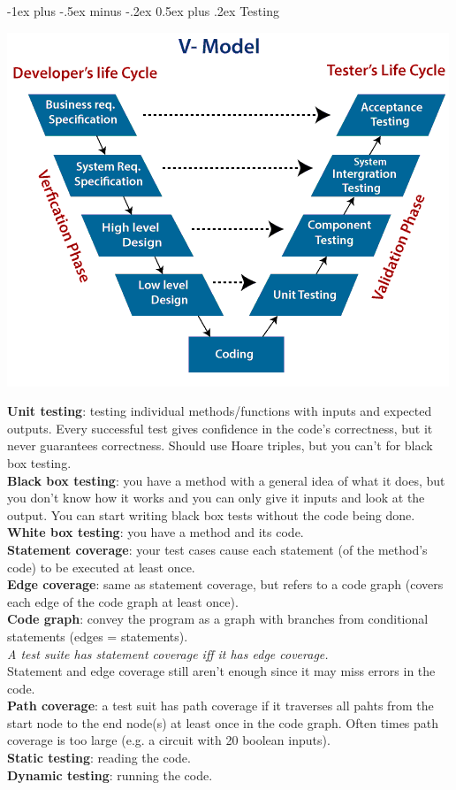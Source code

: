 \documentclass[10pt,landscape]{article}
\makeatletter
\renewcommand{\section}{\@startsection{section}{1}{0mm}%
                                {-1ex plus -.5ex minus -.2ex}%
                                {0.5ex plus .2ex}%
                                {\normalfont\large\bfseries}}
\makeatother
\begin{document}
\begin{multicols}{3}
\section{Testing}
{\centering\includegraphics[scale=0.4]{img/V-model.png}\par}
\textbf{Unit testing}: testing individual methods/functions with inputs and expected outputs. Every successful test gives confidence in the code's correctness, but it never guarantees correctness. Should use Hoare triples, but you can't for black box testing.\\
\textbf{Black box testing}: you have a method with a general idea of what it does, but you don't know how it works and you can only give it inputs and look at the output. You can start writing black box tests without the code being done.\\
\textbf{White box testing}: you have a method and its code.\\
\textbf{Statement coverage}: your test cases cause each statement (of the method's code) to be executed at least once.\\
\textbf{Edge coverage}: same as statement coverage, but refers to a code graph (covers each edge of the code graph at least once).\\
\textbf{Code graph}: convey the program as a graph with branches from conditional statements (edges = statements).\\
\textit{A test suite has statement coverage iff it has edge coverage.}\\
Statement and edge coverage still aren't enough since it may miss errors in the code.\\
\textbf{Path coverage}: a test suit has path coverage if it traverses all pahts from the start node to the end node(s) at least once in the code graph. Often times path coverage is too large (e.g. a circuit with 20 boolean inputs).\\
\textbf{Static testing}: reading the code.\\
\textbf{Dynamic testing}: running the code.

\end{multicols}
\end{document}
